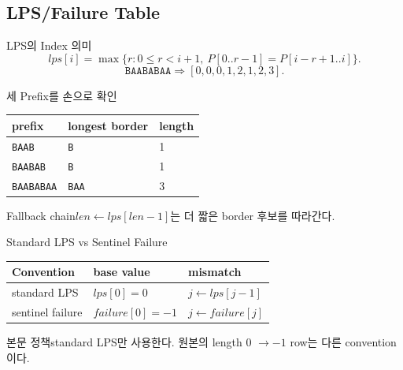 \subsection{LPS/Failure Table}
\begin{frame}{LPS의 Index 의미}
\[
lps[i]=\max\{r:0\le r<i+1,\ P[0..r-1]=P[i-r+1..i]\}.
\]
\[
\texttt{BAABABAA}\Rightarrow[0,0,0,1,2,1,2,3].
\]
\end{frame}
\begin{frame}{세 Prefix를 손으로 확인}
\small\begin{tabular}{lll}\toprule
prefix&longest border&length\\\midrule
\texttt{BAAB}&\texttt{B}&1\\
\texttt{BAABAB}&\texttt{B}&1\\
\texttt{BAABABAA}&\texttt{BAA}&3\\\bottomrule
\end{tabular}
\begin{block}{Fallback chain}\(len\gets lps[len-1]\)는 더 짧은 border 후보를 따라간다.\end{block}
\end{frame}
\begin{frame}{Standard LPS vs Sentinel Failure}
\small\begin{tabular}{lll}\toprule
Convention&base value&mismatch\\\midrule
standard LPS&\(lps[0]=0\)&\(j\gets lps[j-1]\)\\
sentinel failure&\(failure[0]=-1\)&\(j\gets failure[j]\)\\\bottomrule
\end{tabular}
\begin{alertblock}{본문 정책}standard LPS만 사용한다. 원본의 length 0 \(\to-1\) row는 다른 convention이다.\end{alertblock}
\end{frame}
